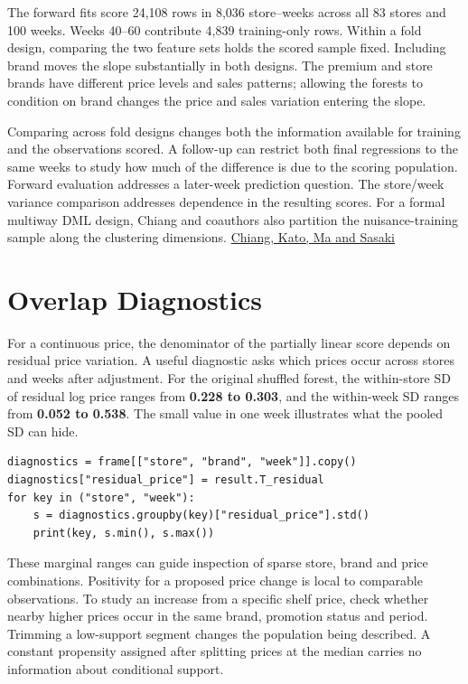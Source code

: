 The forward fits score 24,108 rows in 8,036 store--weeks across all 83 stores and 100 weeks. Weeks 40--60 contribute 4,839 training-only rows. Within a fold design, comparing the two feature sets holds the scored sample fixed. Including brand moves the slope substantially in both designs. The premium and store brands have different price levels and sales patterns; allowing the forests to condition on brand changes the price and sales variation entering the slope.

Comparing across fold designs changes both the information available for training and the observations scored. A follow-up can restrict both final regressions to the same weeks to study how much of the difference is due to the scoring population. Forward evaluation addresses a later-week prediction question. The store/week variance comparison addresses dependence in the resulting scores. For a formal multiway DML design, Chiang and coauthors also partition the nuisance-training sample along the clustering dimensions. \href{https://doi.org/10.1080/07350015.2021.1895815}{Chiang, Kato, Ma and Sasaki}

\section{Overlap Diagnostics}\label{sec:overlap_diagnostics}

For a continuous price, the denominator of the partially linear score depends on residual price variation. A useful diagnostic asks which prices occur across stores and weeks after adjustment. For the original shuffled forest, the within-store SD of residual log price ranges from \textbf{0.228 to 0.303}, and the within-week SD ranges from \textbf{0.052 to 0.538}. The small value in one week illustrates what the pooled SD can hide.

\begin{verbatim}
diagnostics = frame[["store", "brand", "week"]].copy()
diagnostics["residual_price"] = result.T_residual
for key in ("store", "week"):
    s = diagnostics.groupby(key)["residual_price"].std()
    print(key, s.min(), s.max())
\end{verbatim}

These marginal ranges can guide inspection of sparse store, brand and price combinations. Positivity for a proposed price change is local to comparable observations. To study an increase from a specific shelf price, check whether nearby higher prices occur in the same brand, promotion status and period. Trimming a low-support segment changes the population being described. A constant propensity assigned after splitting prices at the median carries no information about conditional support.

